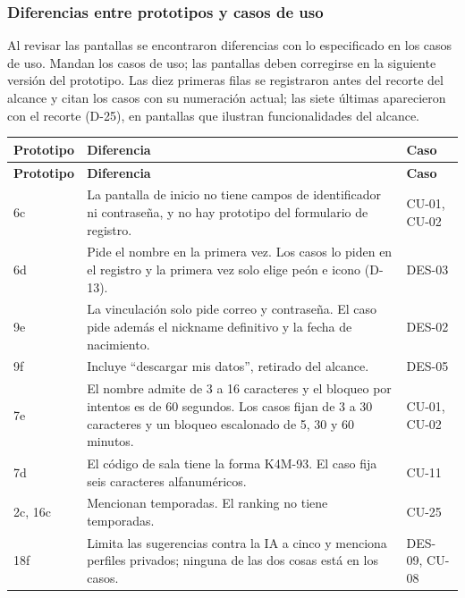 \subsubsection*{Diferencias entre prototipos y casos de uso}
Al revisar las pantallas se encontraron diferencias con lo especificado en los casos de uso. Mandan los casos de uso; las pantallas deben corregirse en la siguiente versión del prototipo. Las diez primeras filas se registraron antes del recorte del alcance y citan los casos con su numeración actual; las siete últimas aparecieron con el recorte (\mbox{D-25}), en pantallas que ilustran funcionalidades del alcance.

\begin{center}\small
\begin{longtable}{|L{0.13\textwidth}|L{0.61\textwidth}|L{0.16\textwidth}|}
\hline
\textbf{Prototipo} & \textbf{Diferencia} & \textbf{Caso} \\ \hline
\endfirsthead
\hline
\textbf{Prototipo} & \textbf{Diferencia} & \textbf{Caso} \\ \hline
\endhead
6c & La pantalla de inicio no tiene campos de identificador ni contraseña, y no hay prototipo del formulario de registro. & \mbox{CU-01}, \mbox{CU-02} \\ \hline
6d & Pide el nombre en la primera vez. Los casos lo piden en el registro y la primera vez solo elige peón e icono (\mbox{D-13}). & \mbox{DES-03} \\ \hline
9e & La vinculación solo pide correo y contraseña. El caso pide además el nickname definitivo y la fecha de nacimiento. & \mbox{DES-02} \\ \hline
9f & Incluye ``descargar mis datos'', retirado del alcance. & \mbox{DES-05} \\ \hline
7e & El nombre admite de 3 a 16 caracteres y el bloqueo por intentos es de 60 segundos. Los casos fijan de 3 a 30 caracteres y un bloqueo escalonado de 5, 30 y 60 minutos. & \mbox{CU-01}, \mbox{CU-02} \\ \hline
7d & El código de sala tiene la forma K4M-93. El caso fija seis caracteres alfanuméricos. & \mbox{CU-11} \\ \hline
2c, 16c & Mencionan temporadas. El ranking no tiene temporadas. & \mbox{CU-25} \\ \hline
18f & Limita las sugerencias contra la IA a cinco y menciona perfiles privados; ninguna de las dos cosas está en los casos. & \mbox{DES-09}, \mbox{CU-08} \\ \hline

\end{longtable}
\end{center}
